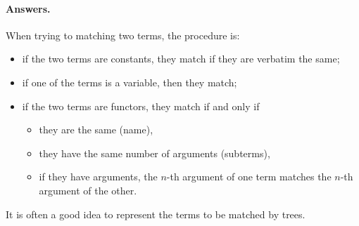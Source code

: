 \paragraph{Answers.} When trying to matching two terms, the procedure
is:
\begin{itemize}

  \item if the two terms are constants, they match if they are
    verbatim the same;

  \item if one of the terms is a variable, then they match;

  \item if the two terms are functors, they match if and only if
  \begin{itemize}

    \item they are the same (name),

    \item they have the same number of arguments (subterms),

    \item if they have arguments, the \(n\)-th argument of one term
      matches the \(n\)-th argument of the other.

  \end{itemize}

\end{itemize}
\noindent It is often a good idea to represent the terms to be matched
by trees.

